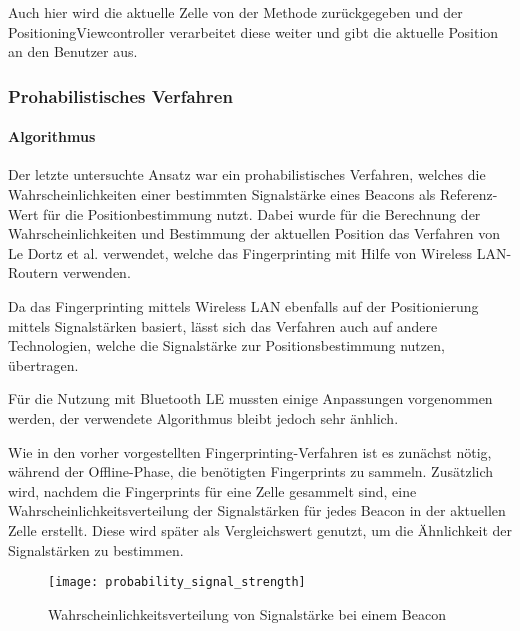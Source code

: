 Auch hier wird die aktuelle Zelle von der Methode zurückgegeben und der PositioningViewcontroller verarbeitet diese weiter und gibt die aktuelle Position an den Benutzer aus.

\subsubsection{Prohabilistisches Verfahren}
\label{sec:implementation:fingerprinting:positioning:probability}

\paragraph{Algorithmus}
\label{sec:implementation:fingerprinting:positioning:probability:algorithm}

Der letzte untersuchte Ansatz war ein prohabilistisches Verfahren, welches die Wahrscheinlichkeiten einer bestimmten Signalstärke eines Beacons als Referenz-Wert für die Positionbestimmung nutzt. Dabei wurde für die Berechnung der Wahrscheinlichkeiten und Bestimmung der aktuellen Position das Verfahren von Le Dortz et al. \cite{wifiFingerprintProbability} verwendet, welche das Fingerprinting mit Hilfe von Wireless LAN-Routern verwenden.

Da das Fingerprinting mittels Wireless LAN ebenfalls auf der Positionierung mittels Signalstärken basiert, lässt sich das Verfahren auch auf andere Technologien, welche die Signalstärke zur Positionsbestimmung nutzen, übertragen.

Für die Nutzung mit Bluetooth LE mussten einige Anpassungen vorgenommen werden, der verwendete Algorithmus bleibt jedoch sehr änhlich.

Wie in den vorher vorgestellten Fingerprinting-Verfahren ist es zunächst nötig, während der Offline-Phase, die benötigten Fingerprints zu sammeln.
Zusätzlich wird, nachdem die Fingerprints für eine Zelle gesammelt sind, eine Wahrscheinlichkeitsverteilung der Signalstärken für jedes Beacon in der aktuellen Zelle erstellt. Diese wird später als Vergleichswert genutzt, um die Ähnlichkeit der Signalstärken zu bestimmen.

\begin{figure}[htb!]
		\centering
	\texttt{[image: probability\_signal\_strength]}
	\caption{Wahrscheinlichkeitsverteilung von Signalstärke bei einem Beacon}
	\label{probability-signal-strength-beacon}
\end{figure}


